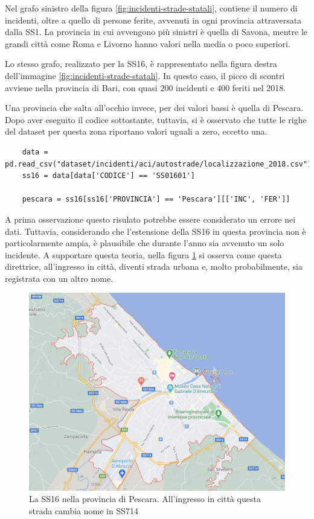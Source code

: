 \documentclass[a4paper,12pt]{report}
\begin{document}
Nel grafo sinistro della figura \ref{fig:incidenti-strade-statali}, contiene il numero di 
incidenti, oltre a quello di persone ferite, avvenuti in ogni provincia attraversata dalla SS1. 
La provincia in cui avvengono più sinistri è quella di Savona, mentre le grandi città come 
Roma e Livorno hanno valori nella media o poco superiori.

Lo stesso grafo, realizzato per la SS16, è rappresentato nella figura destra dell'immagine 
\ref{fig:incidenti-strade-statali}. 
In questo caso, il picco di scontri avviene nella provincia 
di Bari, con quasi $200$ incidenti e $400$ feriti nel 2018. 

Una provincia che salta all'occhio invece, per dei valori bassi è quella di Pescara. 
Dopo aver eseguito il codice sottostante, tuttavia, si è osservato che tutte le righe 
del dataset per questa zona riportano valori uguali a zero, eccetto una. 

\begin{lstlisting}
    data = pd.read_csv("dataset/incidenti/aci/autostrade/localizzazione_2018.csv")
    ss16 = data[data['CODICE'] == 'SS01601']

    pescara = ss16[ss16['PROVINCIA'] == 'Pescara'][['INC', 'FER']]
\end{lstlisting}

A prima osservazione questo risulato potrebbe essere considerato un errore nei dati. 
Tuttavia, considerando che l'estensione della SS16 in questa provincia non 
è particolarmente ampia, è plausibile che durante l'anno sia avvenuto un solo incidente. 
A supportare questa teoria, nella figura \ref{fig:ss16-pescara} si osserva come 
questa direttrice, all'ingresso in città, diventi strada urbana e, molto probabilmente, 
sia registrata con un altro nome.

\begin{figure}
    \includegraphics[width=0.5\linewidth]{img/pescara_ss16.png}
    \caption{La SS16 nella provincia di Pescara. All'ingresso in città questa strada cambia nome in SS714}
    \label{fig:ss16-pescara}
\end{figure}
\end{document}
